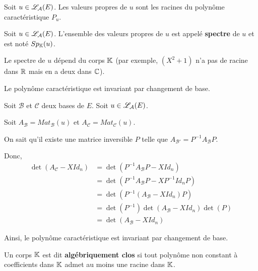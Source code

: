 \documentclass[a4paper, 12pt]{article}
\begin{document}
\begin{proposition}{}{}
    Soit $u \in \mathscr{L}_\mathcal{A}(E)$. Les valeurs propres de $u$ sont les racines du polynôme caractéristique $P_u$.
\end{proposition}

\begin{definition}
    Soit $u \in \mathscr{L}_\mathcal{A}(E)$. L'ensemble des valeurs propres de $u$ est appelé \textbf{spectre} de $u$ et est noté $Sp_{\mathbb{K}}(u)$.
\end{definition}

\begin{remarque}
    Le spectre de $u$ dépend du corps $\mathbb{K}$ (par exemple, $(X^2 + 1)$ n'a pas de racine dans $\mathbb{R}$ mais en a deux dans $\mathbb{C}$).
\end{remarque}

\begin{proposition}{}{}
    Le polynôme caractéristique est invariant par changement de base.
\end{proposition}

\begin{demonstration}
    Soit $\mathcal{B}$ et $\mathcal{C}$ deux bases de $E$.
    Soit $u \in \mathscr{L}_\mathcal{A}(E)$.

    Soit $A_\mathcal{B} = Mat_{\mathcal{B}}(u)$ et $A_{\mathcal{C}} = Mat_{\mathcal{C}}(u)$.
    
    On sait qu'il existe une matrice inversible $P$ telle que $A_{\mathcal{B'}} = P^{-1} A_\mathcal{B} P$.
    
    Donc,
    \begin{align*}
        \det(A_\mathcal{C} - X Id_n) &= \det(P^{-1} A_{\mathcal{B}} P - X Id_n) \\
        &= \det(P^{-1} A_{\mathcal{B}} P - X P^{-1} Id_n P) \\
        &= \det(P^{-1} (A_{\mathcal{B}} - X Id_n) P) \\
        &= \det(P^{-1}) \det(A_{\mathcal{B}} - X Id_n) \det(P) \\
        &= \det(A_{\mathcal{B}} - X Id_n)
    \end{align*}
    
    Ainsi, le polynôme caractéristique est invariant par changement de base.
\end{demonstration}

\begin{definition}
    Un corps $\mathbb{K}$ est dit \textbf{algébriquement clos} si tout polynôme non constant à coefficients dans $\mathbb{K}$ admet au moins une racine dans $\mathbb{K}$.
\end{definition}
\end{document}
